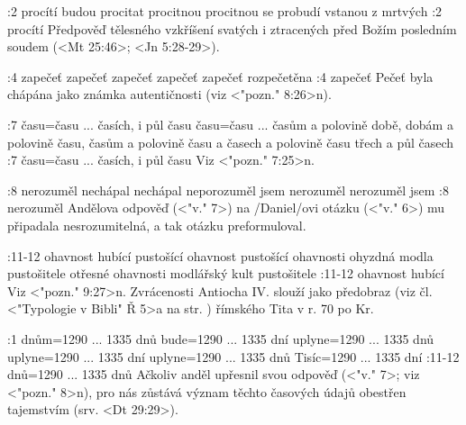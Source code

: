 :2  
    {procítí}  %
    {budou procitat} %
    {procitnou}  %
    {procitnou} %
    {se probudí}  %
    {vstanou z mrtvých}  %
:2 {procítí} Předpověď tělesného vzkříšení svatých i ztracených před Božím posledním soudem (<Mt 25:46>; <Jn 5:28-29>).

:4  
    {zapečeť}  %
    {zapečeť} %
    {zapečeť}  %
    {zapečeť} %
    {zapečeť}  %
    {rozpečetěna}  %
:4 {zapečeť} Pečeť byla chápána jako známka autentičnosti (viz <"pozn." 8:26>n).

:7
    {času}={času ... časích, i půl času}  %
    {času}={času ... časům a polovině} %
    {době, dobám a polovině}  %
    {času, časům a polovině}%
    {času a časech a polovině času}  %
    {třech a půl časech}  %
:7 {času}={času ... časích, i půl času} Viz <"pozn." 7:25>n.


:8
    {nerozuměl}  %
    {nechápal} %
    {nechápal}  %
    {neporozuměl jsem} %
    {nerozuměl}  %
    {nerozuměl jsem}  %
:8 {nerozuměl} Andělova odpověď (<"v." 7>) na \x/Daniel/ovi otázku (<"v." 6>) mu připadala nesrozumitelná, a tak otázku preformuloval. 


:11-12  
    {ohavnost hubící}  %
    {pustošící ohavnost} %
    {pustošící ohavnosti}  %
    {ohyzdná modla pustošitele} %
    {otřesné ohavnosti}  %
    {modlářský kult pustošitele}  %
:11-12 {ohavnost hubící} Viz <"pozn." 9:27>n. Zvrácenosti Antiocha IV. slouží jako předobraz (viz čl. <"Typologie v Bibli" Ř 5>a na str. \pg) římského Tita v r. 70 po Kr. 
 
:1  
    {dnům}={1290 ... 1335 dnů}      %
    {bude}={1290 ... 1335 dní}      %
    {uplyne}={1290 ... 1335 dnů}    %
    {uplyne}={1290 ... 1335 dní}    %
    {uplyne}={1290 ... 1335 dnů}    %
    {Tisíc}={1290 ... 1335 dní}     %
:11-12 {dnů}={1290 ... 1335 dnů} Ačkoliv anděl upřesnil svou odpověď (<"v." 7>; viz <"pozn." 8>n), pro nás zůstává význam těchto časových údajů obestřen tajemstvím (srv. <Dt 29:29>).






\endinput

\wdef 3:1  
    {}  %
    {} %
    {}  %
    {} %
    {}  %
    {}  %
    
\Note 12:1 {}={}  \x// (<"">) (<"">) 

 >> Ptolemaios II Filadelfos incest s Arsinou II
 >> Ptolemaios III Euergetes rozvedl z Láodikou, oženil s Berenikou
 >> Ptolemaios IV? Filopator
 >> Ptolemaios V == Kleopatra III
 >> Ptolemaios VI
 >> Kleopatry III  
 >> Ptolemaios IX Soter  (Ptolemaios X jeho brácha) syn Kleopatry III + Ptolemaia VIII  
 >> Ptolemaios XII 
 >> Kleopatra VII
 
